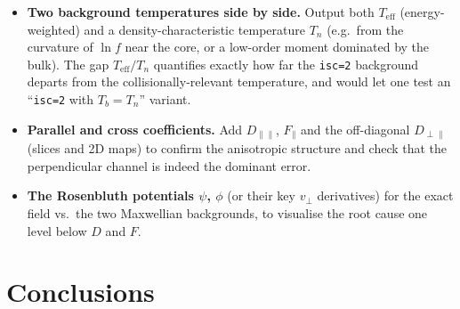 \documentclass[11pt,a4paper]{article}
\begin{document}
\begin{itemize}
  \item \textbf{Two background temperatures side by side.} Output both
        $T_\text{eff}$ (energy-weighted) and a density-characteristic
        temperature $T_n$ (e.g.\ from the curvature of $\ln f$ near the core,
        or a low-order moment dominated by the bulk). The gap
        $T_\text{eff}/T_n$ quantifies exactly how far the \texttt{isc=2}
        background departs from the collisionally-relevant temperature, and
        would let one test an ``\texttt{isc=2} with $T_b = T_n$'' variant.

  \item \textbf{Parallel and cross coefficients.} Add $D_{\parallel\parallel}$,
        $F_\parallel$ and the off-diagonal $D_{\perp\parallel}$ (slices and 2D
        maps) to confirm the anisotropic structure and check that the
        perpendicular channel is indeed the dominant error.

  \item \textbf{The Rosenbluth potentials $\psi$, $\phi$} (or their key
        $v_\perp$ derivatives) for the exact field vs.\ the two Maxwellian
        backgrounds, to visualise the root cause one level below $D$ and $F$.
\end{itemize}

\section{Conclusions}
\end{document}
